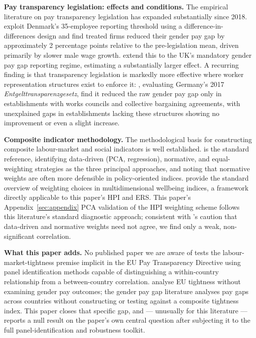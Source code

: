 \documentclass[12pt,a4paper]{article}
\begin{document}
\medskip
\noindent\textbf{Pay transparency legislation: effects and conditions.}  The
empirical literature on pay transparency legislation has expanded substantially
since 2018.  \citet{BennedsenEtAl2022} exploit Denmark's 35-employee reporting
threshold using a difference-in-differences design and find treated firms reduced
their gender pay gap by approximately 2 percentage points relative to the
pre-legislation mean, driven primarily by slower male wage growth.
\citet{BlundellEtAl2025} extend this to the UK's mandatory gender pay gap
reporting regime, estimating a substantially larger effect.  A recurring finding
is that transparency legislation is markedly more effective where worker
representation structures exist to enforce it: \citet{VaccaroEtAl2024},
evaluating Germany's 2017 \textit{Entgelttransparenzgesetz}, find it reduced the
raw gender pay gap only in establishments with works councils and collective
bargaining agreements, with unexplained gaps in establishments lacking these
structures showing no improvement or even a slight increase.

\medskip
\noindent\textbf{Composite indicator methodology.}  The methodological basis for
constructing composite labour-market and social indicators is well established.
\citet{NardoEtAl2008} is the standard reference, identifying data-driven (PCA,
regression), normative, and equal-weighting strategies as the three principal
approaches, and noting that normative weights are often more defensible in
policy-oriented indices.  \citet{DecancqLugo2013} provide the standard overview
of weighting choices in multidimensional wellbeing indices, a framework directly
applicable to this paper's HPI and ERS.  This paper's Appendix~\ref{sec:appendix}
PCA validation of the HPI weighting scheme follows this literature's standard
diagnostic approach; consistent with \citeauthor{NardoEtAl2008}'s caution that
data-driven and normative weights need not agree, we find only a weak,
non-significant correlation.

\medskip
\noindent\textbf{What this paper adds.}  No published paper we are aware of
tests the labour-market-tightness premise implicit in the EU Pay Transparency
Directive using panel identification methods capable of distinguishing a
within-country relationship from a between-country correlation.
\citet{KissEtAl2022} analyse EU tightness without examining gender pay outcomes;
the gender pay gap literature \citep{OlivettiPetrongolo2008, Hedija2017,
BlauKahn2017} analyses pay gaps across countries without constructing or testing
against a composite tightness index.  This paper closes that specific gap, and
--- unusually for this literature --- reports a null result on the paper's own
central question after subjecting it to the full panel-identification and
robustness toolkit.
\end{document}
